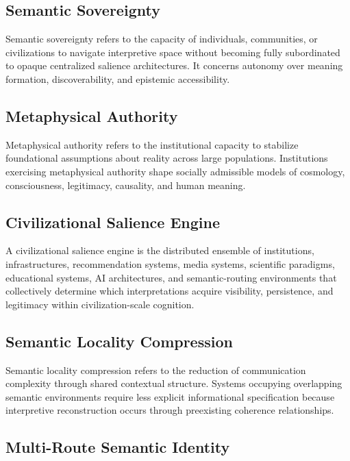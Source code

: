 \documentclass[11pt,a4paper]{article}
\begin{document}
\subsection{Semantic Sovereignty}

Semantic sovereignty refers to the capacity of individuals, communities, or civilizations to navigate interpretive space without becoming fully subordinated to opaque centralized salience architectures. It concerns autonomy over meaning formation, discoverability, and epistemic accessibility.

\subsection{Metaphysical Authority}

Metaphysical authority refers to the institutional capacity to stabilize foundational assumptions about reality across large populations. Institutions exercising metaphysical authority shape socially admissible models of cosmology, consciousness, legitimacy, causality, and human meaning.

\subsection{Civilizational Salience Engine}

A civilizational salience engine is the distributed ensemble of institutions, infrastructures, recommendation systems, media systems, scientific paradigms, educational systems, AI architectures, and semantic-routing environments that collectively determine which interpretations acquire visibility, persistence, and legitimacy within civilization-scale cognition.

\subsection{Semantic Locality Compression}

Semantic locality compression refers to the reduction of communication complexity through shared contextual structure. Systems occupying overlapping semantic environments require less explicit informational specification because interpretive reconstruction occurs through preexisting coherence relationships.

\subsection{Multi-Route Semantic Identity}
\end{document}
